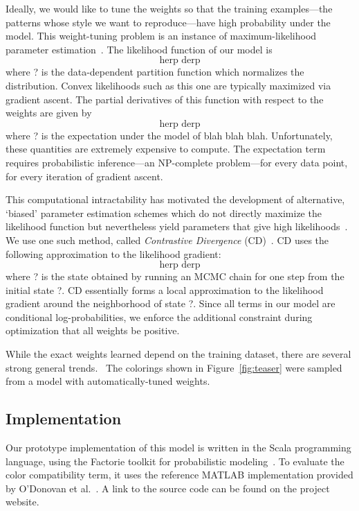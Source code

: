 Ideally, we would like to tune the weights so that the training examples---the patterns whose style we want to reproduce---have high probability under the model. This weight-tuning problem is an instance of maximum-likelihood parameter estimation~\cite{PGMBook}. The likelihood function of our model is
\begin{equation*}
\text{herp derp}
\end{equation*}
where ? is the data-dependent partition function which normalizes the distribution. Convex likelihoods such as this one are typically maximized via gradient ascent. The partial derivatives of this function with respect to the weights are given by
\begin{equation*}
\text{herp derp}
\end{equation*}
where ? is the expectation under the model of blah blah blah. Unfortunately, these quantities are extremely expensive to compute. The expectation term requires probabilistic inference---an NP-complete problem---for every data point, for every iteration of gradient ascent.

This computational intractability has motivated the development of alternative, `biased' parameter estimation schemes which do not directly maximize the likelihood function but nevertheless yield parameters that give high likelihoods~\cite{NonMLEParameterEstimation}. We use one such method, called \emph{Contrastive Divergence} (CD)~\cite{ContrastiveDivergence}. CD uses the following approximation to the likelihood gradient:
\begin{equation*}
\text{herp derp}
\end{equation*}
where ? is the state obtained by running an MCMC chain for one step from the initial state ?. CD essentially forms a local approximation to the likelihood gradient around the neighborhood of state ?. Since all terms in our model are conditional log-probabilities, we enforce the additional constraint during optimization that all weights be positive.~

While the exact weights learned depend on the training dataset, there are several strong general trends.~ The colorings shown in Figure~\ref{fig:teaser} were sampled from a model with automatically-tuned weights.

\subsection{Implementation}
\label{sec:implementation}

Our prototype implementation of this model is written in the Scala programming language, using the Factorie toolkit for probabilistic modeling~\cite{Factorie}. To evaluate the color compatibility term, it uses the reference MATLAB implementation provided by O'Donovan et al.~. A link to the source code can be found on the project website.